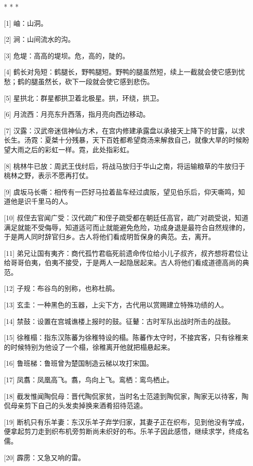 \documentclass[12pt,UTF8]{ctexbook}
\begin{document}
* * *



[1] 岫：山洞。

[2] 涧：山间流水的沟。

[3] 危堤：高高的堤坝。危，高的，陡的。

[4] 鹤长对凫短：鹤腿长，野鸭腿短。野鸭的腿虽然短，续上一截就会使它感到忧愁；鹤的腿虽然长，砍下一段就会使它感到悲伤。

[5] 星拱北：群星都拱卫着北极星。拱，环绕，拱卫。

[6] 月流西：月亮东升西落，指月亮向西边移动。

[7] 汉露：汉武帝迷信神仙方术，在宫内修建承露盘以承接天上降下的甘露，以求长生。汤霓：夏桀十分残暴，天下百姓都希望商汤来解救自己，就像大旱的时候盼望大雨之后的彩虹一样。霓，此处指彩虹。

[8] 桃林牛已放：周武王伐纣后，将战马放归于华山之南，将运输粮草的牛放归于桃林之野，表示不愿再打仗。

[9] 虞坂马长嘶：相传有一匹好马拉着盐车经过虞阪，望见伯乐后，仰天嘶鸣，知道他是识千里马的人。

[10] 叔侄去官闻广受：汉代疏广和侄子疏受都在朝廷任高官，疏广对疏受说，知道满足就能不受侮辱，知道适可而止就能避免危险，功成身退是最符合自然规律的，于是两人同时辞官归乡。古人将他们看成明哲保身的典范。去，离开。

[11] 弟兄让国有夷齐：商代孤竹君临死前遗命传位给小儿子叔齐，叔齐想将君位让给哥哥伯夷，伯夷不接受，于是两人一起隐居起来。古人将他们看成道德高尚的典范。

[12] 子规：布谷鸟的别称，也称杜鹃。

[13] 玄圭：一种黑色的玉器，上尖下方，古代用以赏赐建立特殊功绩的人。

[14] 禁鼓：设置在宫城谯楼上报时的鼓。征鼙：古时军队出战时所击的战鼓。

[15] 徐稚榻：指东汉陈蕃为徐稚特设的榻。陈蕃作太守时，不接宾客，只有徐稚来的时候特别为他设了一个榻，徐稚离开他就把榻悬起来。

[16] 鲁班梯：鲁班曾为楚国制造云梯以攻打宋国。

[17] 凤翥：凤凰高飞。翥，鸟向上飞。鸾栖：鸾鸟栖止。

[18] 截发惟闻陶侃母：晋代陶侃家贫，当时名士范逵到陶侃家，陶家无以待客，陶侃母亲剪下自己的头发卖掉换来酒肴招待范逵。

[19] 断机只有乐羊妻：东汉乐羊子弃学归家，其妻子正在织布，见到他没有学成，便拿起剪刀走到织布机旁剪断尚未织好的布。乐羊子因此感悟，继续求学，终成名儒。

[20] 霹雳：又急又响的雷。
\end{document}
